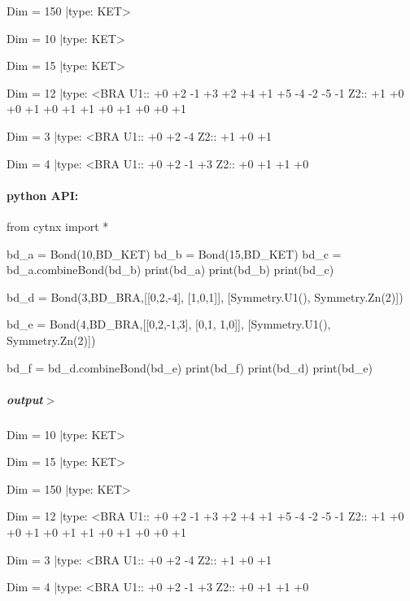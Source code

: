 \begin{DoxyVerbInclude}
Dim = 150 |type: KET>     

Dim = 10 |type: KET>     

Dim = 15 |type: KET>     

Dim = 12 |type: <BRA     
 U1::  +0 +2 -1 +3 +2 +4 +1 +5 -4 -2 -5 -1
 Z2::  +1 +0 +0 +1 +0 +1 +1 +0 +1 +0 +0 +1

Dim = 3 |type: <BRA     
 U1::  +0 +2 -4
 Z2::  +1 +0 +1

Dim = 4 |type: <BRA     
 U1::  +0 +2 -1 +3
 Z2::  +0 +1 +1 +0

\end{DoxyVerbInclude}
 \paragraph*{python A\+PI\+:}


\begin{DoxyCodeInclude}
\textcolor{keyword}{from} cytnx \textcolor{keyword}{import} *


bd\_a = Bond(10,BD\_KET)
bd\_b = Bond(15,BD\_KET)
bd\_c = bd\_a.combineBond(bd\_b)
print(bd\_a)
print(bd\_b)
print(bd\_c)


bd\_d = Bond(3,BD\_BRA,[[0,2,-4],
                      [1,0,1]],
                      [Symmetry.U1(),
                       Symmetry.Zn(2)])
                                
bd\_e = Bond(4,BD\_BRA,[[0,2,-1,3],
                      [0,1, 1,0]],
                      [Symmetry.U1(),
                       Symmetry.Zn(2)])

bd\_f = bd\_d.combineBond(bd\_e)
print(bd\_f)
print(bd\_d)
print(bd\_e)
\end{DoxyCodeInclude}
 \subparagraph*{output$>$}


\begin{DoxyVerbInclude}
Dim = 10 |type: KET>     

Dim = 15 |type: KET>     

Dim = 150 |type: KET>     

Dim = 12 |type: <BRA     
 U1::  +0 +2 -1 +3 +2 +4 +1 +5 -4 -2 -5 -1
 Z2::  +1 +0 +0 +1 +0 +1 +1 +0 +1 +0 +0 +1

Dim = 3 |type: <BRA     
 U1::  +0 +2 -4
 Z2::  +1 +0 +1

Dim = 4 |type: <BRA     
 U1::  +0 +2 -1 +3
 Z2::  +0 +1 +1 +0







\end{DoxyVerbInclude}
 \mbox{\label{classcytnx_1_1Bond_ac21ab26ec469ac56ae78c9e4bbbe7040}} 
